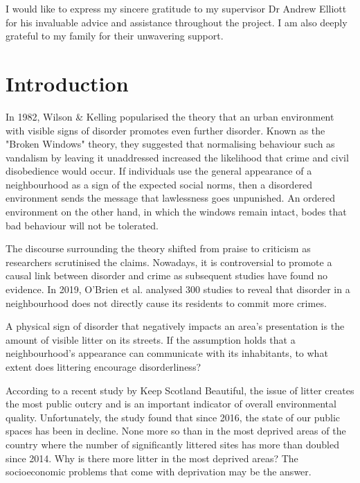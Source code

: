 \documentclass{thesis}
\begin{document}
I would like to express my sincere gratitude to my supervisor Dr Andrew Elliott for his invaluable advice and assistance throughout the project. I am also deeply grateful to my family for their unwavering support.


\listoffigures
\listoftables


\tableofcontents


\chapter{Introduction}

In 1982, Wilson \& Kelling popularised the theory that an urban environment with visible signs of disorder promotes even further disorder. Known as the "Broken Windows" theory, they suggested that normalising behaviour such as vandalism by leaving it unaddressed increased the likelihood that crime and civil disobedience would occur\cite{broken-windows}. If individuals use the general appearance of a neighbourhood as a sign of the expected social norms, then a disordered environment sends the message that lawlessness goes unpunished. An ordered environment on the other hand, in which the windows remain intact, bodes that bad behaviour will not be tolerated.

The discourse surrounding the theory shifted from praise to criticism as researchers scrutinised the claims. Nowadays, it is controversial to promote a causal link between disorder and crime as subsequent studies have found no evidence\cite{OBrien2019LookingTB}. In 2019, O’Brien et al. analysed 300 studies to reveal that disorder in a neighbourhood does not directly cause its residents to commit more crimes.

A physical sign of disorder that negatively impacts an area's presentation is the amount of visible litter on its streets. If the assumption holds that a neighbourhood's appearance can communicate with its inhabitants, to what extent does littering encourage disorderliness?

According to a recent study by Keep Scotland Beautiful, the issue of litter creates the most public outcry and is an important indicator of overall environmental quality\cite{household-survey-2019}. Unfortunately, the study found that since 2016, the state of our public spaces has been in decline. None more so than in the most deprived areas of the country where the number of significantly littered sites has more than doubled since 2014. Why is there more litter in the most deprived areas? The socioeconomic problems that come with deprivation may be the answer.
\end{document}
